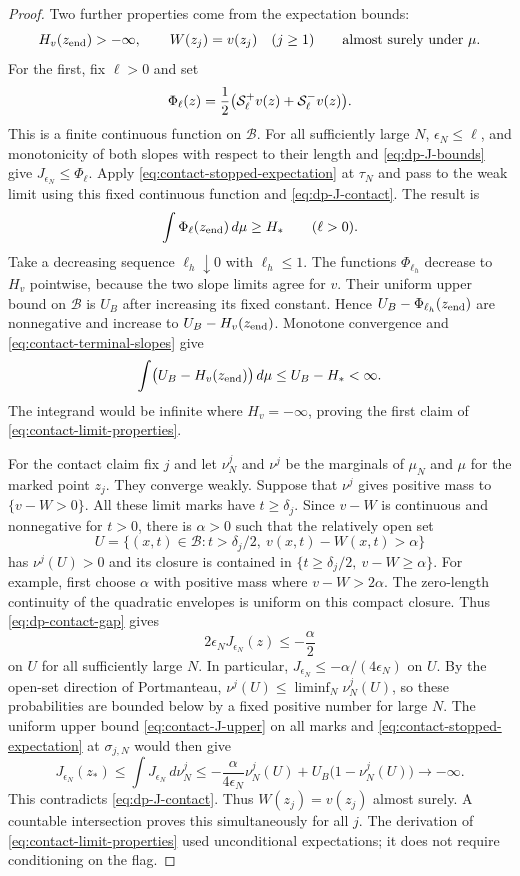 \begin{proof}
Two further properties come from the expectation bounds:
\begin{equation}\label{eq:contact-limit-properties}
  H_v(z_{\rm end})>-\infty,\qquad W(z_j)=v(z_j)\quad(j\ge1)
  \qquad\text{almost surely under }\mu.
\end{equation}
For the first, fix $\ell>0$ and set
\[
  \Phi_\ell(z)=\frac12\bigl(\mathcal{S}^+_\ell v(z)+\mathcal{S}^-_\ell v(z)\bigr).
\]
This is a finite continuous function on $\mathcal B$.  For all sufficiently
large $N$, $\epsilon_N\le\ell$, and monotonicity of both slopes with respect
to their length and \eqref{eq:dp-J-bounds} give
$J_{\epsilon_N}\le\Phi_\ell$.  Apply
\eqref{eq:contact-stopped-expectation} at $\tau_N$ and pass to the weak limit
using this fixed continuous function and \eqref{eq:dp-J-contact}.  The
result is
\begin{equation}\label{eq:contact-terminal-slopes}
  \int\Phi_\ell(z_{\rm end})\,d\mu\ge H_*\qquad(\ell>0).
\end{equation}
Take a decreasing sequence $\ell_h\downarrow0$ with $\ell_h\le1$.  The
functions $\Phi_{\ell_h}$ decrease to $H_v$ pointwise, because the two slope
limits agree for $v$.  Their uniform upper bound on $\mathcal B$ is $U_B$
after increasing its fixed constant.  Hence
$U_B-\Phi_{\ell_h}(z_{\rm end})$ are nonnegative and increase to
$U_B-H_v(z_{\rm end})$.  Monotone convergence and
\eqref{eq:contact-terminal-slopes} give
\[
  \int\bigl(U_B-H_v(z_{\rm end})\bigr)\,d\mu\le U_B-H_*<\infty.
\]
The integrand would be infinite where $H_v=-\infty$, proving the first
claim of \eqref{eq:contact-limit-properties}.

For the contact claim fix $j$ and let $\nu_N^j$ and $\nu^j$ be the marginals
of $\mu_N$ and $\mu$ for the marked point $z_j$.  They converge weakly.
Suppose that $\nu^j$ gives positive mass to $\{v-W>0\}$.  All these limit
marks have $t\ge\delta_j$.  Since $v-W$ is continuous and nonnegative for
$t>0$, there is $\alpha>0$ such that the relatively open set
\[
  U=\{(x,t)\in\mathcal B:t>\delta_j/2,\ v(x,t)-W(x,t)>\alpha\}
\]
has $\nu^j(U)>0$ and its closure is contained in
$\{t\ge\delta_j/2,\ v-W\ge\alpha\}$.  For example, first choose $\alpha$
with positive mass where $v-W>2\alpha$.  The zero-length continuity of the
quadratic envelopes is uniform on this compact closure.  Thus
\eqref{eq:dp-contact-gap} gives
\[
  2\epsilon_NJ_{\epsilon_N}(z)
   \le-\frac{\alpha}{2}
\]
on $U$ for all sufficiently large $N$.  In particular,
$J_{\epsilon_N}\le-\alpha/(4\epsilon_N)$ on $U$.  By the open-set direction
of Portmanteau, $\nu^j(U)\le\liminf_N\nu_N^j(U)$, so these probabilities
are bounded below by a fixed positive number for large $N$.  The uniform
upper bound \eqref{eq:contact-J-upper} on all marks and
\eqref{eq:contact-stopped-expectation} at $\sigma_{j,N}$ would then give
\[
  J_{\epsilon_N}(z_*)\le\int J_{\epsilon_N}\,d\nu_N^j
  \le-\frac{\alpha}{4\epsilon_N}\nu_N^j(U)
      +U_B\bigl(1-\nu_N^j(U)\bigr)\longrightarrow-\infty.
\]
This contradicts \eqref{eq:dp-J-contact}.  Thus $W(z_j)=v(z_j)$ almost
surely.  A countable intersection proves this simultaneously for all $j$.
The derivation of \eqref{eq:contact-limit-properties} used unconditional
expectations; it does not require conditioning on the flag.


\end{proof}
